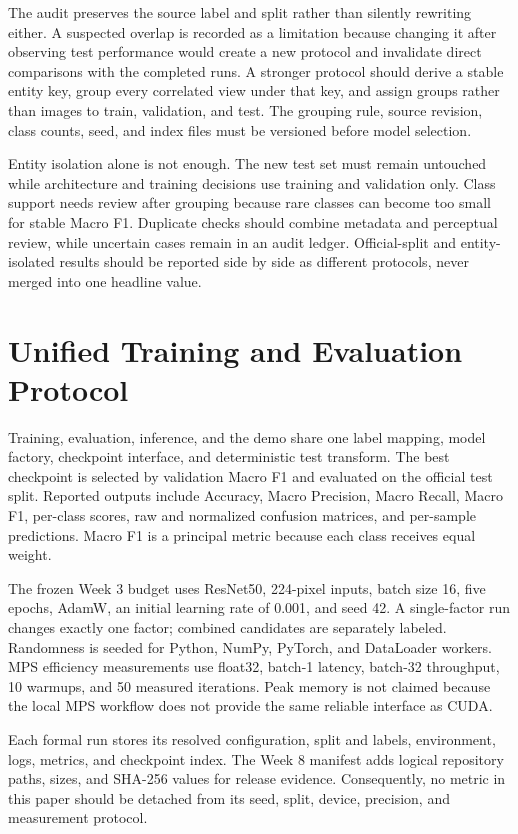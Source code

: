 \documentclass[11pt]{article}
\begin{document}
The audit preserves the source label and split rather than silently rewriting either. A suspected overlap is recorded as a limitation because changing it after observing test performance would create a new protocol and invalidate direct comparisons with the completed runs. A stronger protocol should derive a stable entity key, group every correlated view under that key, and assign groups rather than images to train, validation, and test. The grouping rule, source revision, class counts, seed, and index files must be versioned before model selection.

Entity isolation alone is not enough. The new test set must remain untouched while architecture and training decisions use training and validation only. Class support needs review after grouping because rare classes can become too small for stable Macro F1. Duplicate checks should combine metadata and perceptual review, while uncertain cases remain in an audit ledger. Official-split and entity-isolated results should be reported side by side as different protocols, never merged into one headline value.

\section{Unified Training and Evaluation Protocol}

Training, evaluation, inference, and the demo share one label mapping, model factory, checkpoint interface, and deterministic test transform. The best checkpoint is selected by validation Macro F1 and evaluated on the official test split. Reported outputs include Accuracy, Macro Precision, Macro Recall, Macro F1, per-class scores, raw and normalized confusion matrices, and per-sample predictions. Macro F1 is a principal metric because each class receives equal weight.

The frozen Week 3 budget uses ResNet50, 224-pixel inputs, batch size 16, five epochs, AdamW, an initial learning rate of 0.001, and seed 42. A single-factor run changes exactly one factor; combined candidates are separately labeled. Randomness is seeded for Python, NumPy, PyTorch, and DataLoader workers. MPS efficiency measurements use float32, batch-1 latency, batch-32 throughput, 10 warmups, and 50 measured iterations. Peak memory is not claimed because the local MPS workflow does not provide the same reliable interface as CUDA.

Each formal run stores its resolved configuration, split and labels, environment, logs, metrics, and checkpoint index. The Week 8 manifest adds logical repository paths, sizes, and SHA-256 values for release evidence. Consequently, no metric in this paper should be detached from its seed, split, device, precision, and measurement protocol.
\end{document}
